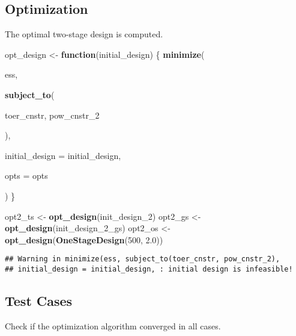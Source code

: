 \documentclass[]{book}
\newenvironment{Shaded}{\begin{snugshade}}{\end{snugshade}}
\newcommand{\ControlFlowTok}[1]{\textcolor[rgb]{0.13,0.29,0.53}{\textbf{#1}}}
\newcommand{\DataTypeTok}[1]{\textcolor[rgb]{0.13,0.29,0.53}{#1}}
\newcommand{\DecValTok}[1]{\textcolor[rgb]{0.00,0.00,0.81}{#1}}
\newcommand{\FloatTok}[1]{\textcolor[rgb]{0.00,0.00,0.81}{#1}}
\newcommand{\KeywordTok}[1]{\textcolor[rgb]{0.13,0.29,0.53}{\textbf{#1}}}
\newcommand{\NormalTok}[1]{#1}
\newcommand{\OperatorTok}[1]{\textcolor[rgb]{0.81,0.36,0.00}{\textbf{#1}}}
\newcommand{\StringTok}[1]{\textcolor[rgb]{0.31,0.60,0.02}{#1}}
\begin{document}
\hypertarget{optimization-7}{%
\subsection{Optimization}\label{optimization-7}}

The optimal two-stage design is computed.

\begin{Shaded}
\begin{Highlighting}[]
\NormalTok{opt_design <-}\StringTok{ }\ControlFlowTok{function}\NormalTok{(initial_design) \{}
    \KeywordTok{minimize}\NormalTok{(}
        
\NormalTok{        ess,}
        
        \KeywordTok{subject_to}\NormalTok{(}
            
\NormalTok{            toer_cnstr,}
\NormalTok{            pow_cnstr_}\DecValTok{2}
            
\NormalTok{        ),}
        
        \DataTypeTok{initial_design =}\NormalTok{ initial_design,}
        
        \DataTypeTok{opts =}\NormalTok{ opts}
        
\NormalTok{)}
\NormalTok{\}}

\NormalTok{opt2_ts <-}\StringTok{ }\KeywordTok{opt_design}\NormalTok{(init_design_}\DecValTok{2}\NormalTok{)}
\NormalTok{opt2_gs <-}\StringTok{ }\KeywordTok{opt_design}\NormalTok{(init_design_}\DecValTok{2}\NormalTok{_gs)}
\NormalTok{opt2_os <-}\StringTok{ }\KeywordTok{opt_design}\NormalTok{(}\KeywordTok{OneStageDesign}\NormalTok{(}\DecValTok{500}\NormalTok{, }\FloatTok{2.0}\NormalTok{))}
\end{Highlighting}
\end{Shaded}

\begin{verbatim}
## Warning in minimize(ess, subject_to(toer_cnstr, pow_cnstr_2),
## initial_design = initial_design, : initial design is infeasible!
\end{verbatim}

\hypertarget{test-cases-8}{%
\subsection{Test Cases}\label{test-cases-8}}

Check if the optimization algorithm converged in all cases.

\begin{Shaded}
\end{Shaded}
\end{document}
